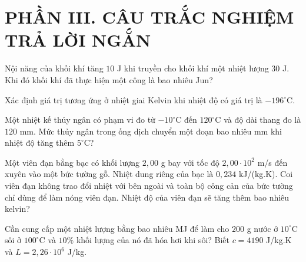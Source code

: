 \section*{PHẦN III. CÂU TRẮC NGHIỆM TRẢ LỜI NGẮN}

\begin{ex}
Nội năng của khối khí tăng $10$ J khi truyền cho khối khí một nhiệt lượng $30$ J. Khi đó khối khí đã thực hiện một công là bao nhiêu Jun?
\end{ex}

\begin{ex}
Xác định giá trị tương ứng ở nhiệt giai Kelvin khi nhiệt độ có giá trị là $-196^\circ\mathrm{C}$.
\loigiai{\[T=t+273=-196+273=77\ \mathrm{K}.\]}
\end{ex}

\begin{ex}
Một nhiệt kế thủy ngân có phạm vi đo từ $-10^\circ\mathrm{C}$ đến $120^\circ\mathrm{C}$ và độ dài thang đo là $120$ mm. Mức thủy ngân trong ống dịch chuyển một đoạn bao nhiêu mm khi nhiệt độ tăng thêm $5^\circ\mathrm{C}$?
\loigiai{\[\Delta T=120-(-10)=130^\circ\mathrm{C}.\]
\[\Delta l=\frac{120}{130}\cdot5\approx4,6\ \mathrm{mm}.\]}
\end{ex}

\begin{ex}
Một viên đạn bằng bạc có khối lượng $2,00$ g bay với tốc độ $2,00\cdot10^2$ m/s đến xuyên vào một bức tường gỗ. Nhiệt dung riêng của bạc là $0,234$ kJ/(kg.K). Coi viên đạn không trao đổi nhiệt với bên ngoài và toàn bộ công cản của bức tường chỉ dùng để làm nóng viên đạn. Nhiệt độ của viên đạn sẽ tăng thêm bao nhiêu kelvin?
\loigiai{\[m=0,002\ \mathrm{kg},\qquad c=234\ \mathrm{J/(kg.K)}.\]
\[Q=\frac12mv^2=\frac12\cdot0,002\cdot(200)^2=40\ \mathrm{J}.\]
\[\Delta T=\frac{Q}{mc}=\frac{40}{0,002\cdot234}\approx85,5\ \mathrm{K}.\]}
\end{ex}

\begin{ex}
Cần cung cấp một nhiệt lượng bằng bao nhiêu MJ để làm cho $200$ g nước ở $10^\circ\mathrm{C}$ sôi ở $100^\circ\mathrm{C}$ và $10\%$ khối lượng của nó đã hóa hơi khi sôi? Biết $c=4190$ J/kg.K và $L=2,26\cdot10^6$ J/kg.
\loigiai{\[m=0,2\ \mathrm{kg}.\]
\[Q_1=0,2\cdot4190\cdot90=75420\ \mathrm{J}.\]
\[m_h=0,1\cdot0,2=0,02\ \mathrm{kg}.\]
\[Q_2=0,02\cdot2,26\cdot10^6=45200\ \mathrm{J}.\]
\[Q=120620\ \mathrm{J}=0,12062\ \mathrm{MJ}\approx0,12\ \mathrm{MJ}.\]}
\end{ex}

